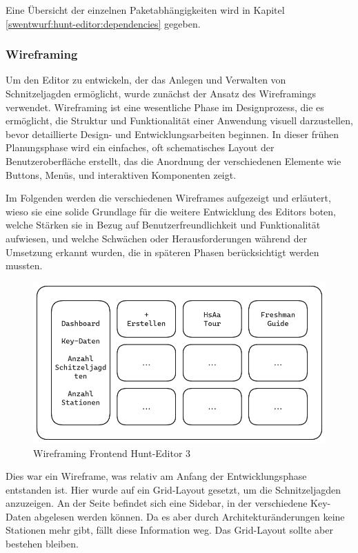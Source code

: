 Eine Übersicht der einzelnen Paketabhängigkeiten wird in Kapitel \ref{swentwurf:hunt-editor:dependencies} gegeben.

\subsubsection{Wireframing}
Um den Editor zu entwickeln, der das Anlegen und Verwalten von Schnitzeljagden ermöglicht, wurde zunächst der Ansatz des Wireframings verwendet. Wireframing ist eine wesentliche Phase im Designprozess, die es ermöglicht, die Struktur und Funktionalität einer Anwendung visuell darzustellen, bevor detaillierte Design- und Entwicklungsarbeiten beginnen. In dieser frühen Planungsphase wird ein einfaches, oft schematisches Layout der Benutzeroberfläche erstellt, das die Anordnung der verschiedenen Elemente wie Buttons, Menüs, und interaktiven Komponenten zeigt. 

Im Folgenden werden die verschiedenen Wireframes aufgezeigt und erläutert, wieso sie eine solide Grundlage für die weitere Entwicklung des Editors boten, welche Stärken sie in Bezug auf Benutzerfreundlichkeit und Funktionalität aufwiesen, und welche Schwächen oder Herausforderungen während der Umsetzung erkannt wurden, die in späteren Phasen berücksichtigt werden mussten.

\begin{figure}[H]
  \centering
  \includegraphics[width=1\textwidth]{images/wireframing/PrAr_Scavhunt_Wireframing-2.1.png}
  \caption{Wireframing Frontend Hunt-Editor 3}
  \label{fig:wireframing-frontend-hunt-editor-3}
\end{figure}

Dies war ein Wireframe, was relativ am Anfang der Entwicklungsphase entstanden ist. Hier wurde auf ein Grid-Layout gesetzt, um die Schnitzeljagden anzuzeigen. An der Seite befindet sich eine Sidebar, in der verschiedene Key-Daten abgelesen werden können. Da es aber durch Architekturänderungen keine Stationen mehr gibt, fällt diese Information weg. Das Grid-Layout sollte aber bestehen bleiben.

